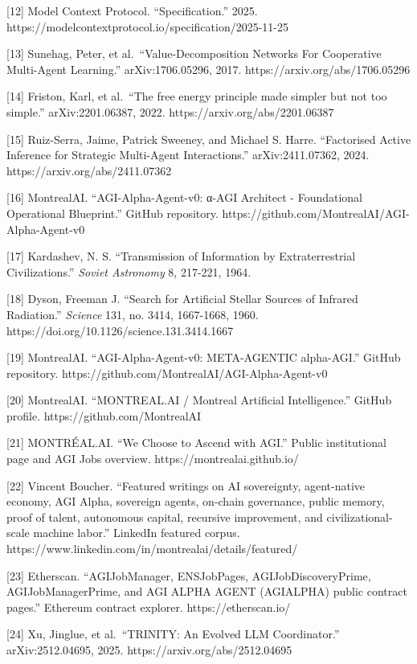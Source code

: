 {[}12{]} Model Context Protocol. ``Specification.'' 2025.
https://modelcontextprotocol.io/specification/2025-11-25

{[}13{]} Sunehag, Peter, et al.~``Value-Decomposition Networks For
Cooperative Multi-Agent Learning.'' arXiv:1706.05296, 2017.
https://arxiv.org/abs/1706.05296

{[}14{]} Friston, Karl, et al.~``The free energy principle made simpler
but not too simple.'' arXiv:2201.06387, 2022.
https://arxiv.org/abs/2201.06387

{[}15{]} Ruiz-Serra, Jaime, Patrick Sweeney, and Michael S. Harre.
``Factorised Active Inference for Strategic Multi-Agent Interactions.''
arXiv:2411.07362, 2024. https://arxiv.org/abs/2411.07362

{[}16{]} MontrealAI. ``AGI-Alpha-Agent-v0: α-AGI Architect -
Foundational Operational Blueprint.'' GitHub repository.
https://github.com/MontrealAI/AGI-Alpha-Agent-v0

{[}17{]} Kardashev, N. S. ``Transmission of Information by
Extraterrestrial Civilizations.'' \emph{Soviet Astronomy} 8, 217-221,
1964.

{[}18{]} Dyson, Freeman J. ``Search for Artificial Stellar Sources of
Infrared Radiation.'' \emph{Science} 131, no. 3414, 1667-1668, 1960.
https://doi.org/10.1126/science.131.3414.1667

{[}19{]} MontrealAI. ``AGI-Alpha-Agent-v0: META-AGENTIC alpha-AGI.''
GitHub repository. https://github.com/MontrealAI/AGI-Alpha-Agent-v0

{[}20{]} MontrealAI. ``MONTREAL.AI / Montreal Artificial Intelligence.''
GitHub profile. https://github.com/MontrealAI

{[}21{]} MONTRÉAL.AI. ``We Choose to Ascend with AGI.'' Public
institutional page and AGI Jobs overview. https://montrealai.github.io/

{[}22{]} Vincent Boucher. ``Featured writings on AI sovereignty,
agent-native economy, AGI Alpha, sovereign agents, on-chain governance,
public memory, proof of talent, autonomous capital, recursive
improvement, and civilizational-scale machine labor.'' LinkedIn featured
corpus. https://www.linkedin.com/in/montrealai/details/featured/

{[}23{]} Etherscan. ``AGIJobManager, ENSJobPages, AGIJobDiscoveryPrime,
AGIJobManagerPrime, and AGI ALPHA AGENT (AGIALPHA) public contract
pages.'' Ethereum contract explorer. https://etherscan.io/

{[}24{]} Xu, Jinglue, et al.~``TRINITY: An Evolved LLM Coordinator.''
arXiv:2512.04695, 2025. https://arxiv.org/abs/2512.04695

